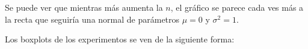 \documentclass[a4paper]{article}
\begin{document}
	Se puede ver que mientras más aumenta la $n$, el gr\'afico se parece cada ves m\'as a la recta que seguir\'ia una normal de par\'ametros $\mu = 0$ y $\sigma^2 = 1$.
	
	Los boxplots de los experimentos se ven de la siguiente forma:
	
	\begin{figure}[H]
		\centering
		\hfill
	\end{figure}
	
\end{document}
